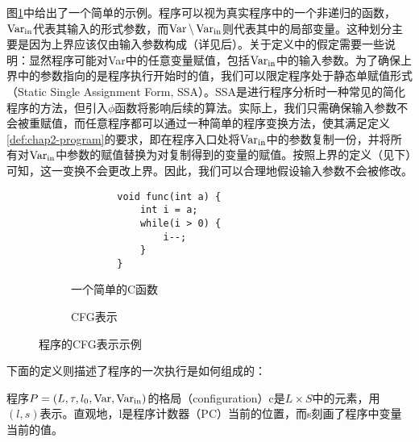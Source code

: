图\ref{fig:chap2-cfg-example}中给出了一个简单的示例。程序可以视为真实程序中的一个非递归的函数，$\operatorname{Var}_{\operatorname{in}}$代表其输入的形式参数，而$\operatorname{Var}
\backslash
\operatorname{Var}_{\operatorname{in}}$则代表其中的局部变量。这种划分主要是因为上界应该仅由输入参数构成（详见后）。关于定义中的假定需要一些说明：显然程序可能对Var中的任意变量赋值，包括$\operatorname{Var}_{\operatorname{in}}$中的输入参数。为了确保上界中的参数指向的是程序执行开始时的值，我们可以限定程序处于静态单赋值形式（Static
Single Assignment Form,
SSA）。SSA是进行程序分析时一种常见的简化程序的方法，但引入$\phi$函数将影响后续的算法。实际上，我们只需确保输入参数不会被重赋值，而任意程序都可以通过一种简单的程序变换方法，使其满足定义\ref{def:chap2-program}的要求，即在程序入口处将$\operatorname{Var}_{\operatorname{in}}$中的参数复制一份，并将所有对$\operatorname{Var}_{\operatorname{in}}$中参数的赋值替换为对复制得到的变量的赋值。按照上界的定义（见下）可知，这一变换不会更改上界。因此，我们可以合理地假设输入参数不会被修改。

\begin{figure}
  \begin{subfigure}[b]{.5\linewidth}
    \begin{verbatim}
        void func(int a) {
            int i = a;
            while(i > 0) {
                i--;
            }
        }
    \end{verbatim}
    \caption{一个简单的C函数}
  \end{subfigure}
  \begin{subfigure}[b]{.5\linewidth}
    \centering
    \caption{CFG表示}
  \end{subfigure}
  \caption{程序的CFG表示示例}
  \label{fig:chap2-cfg-example}
\end{figure}

下面的定义则描述了程序的一次执行是如何组成的：

\begin{definition}
  程序$P = (L, \tau, l_0, \operatorname{Var},
  \operatorname{Var}_{\operatorname{in}})$的格局（configuration）c是$L \times
  S$中的元素，用$(l,
  s)$表示。直观地，l是程序计数器（PC）当前的位置，而s刻画了程序中变量当前的值。
\end{definition}


